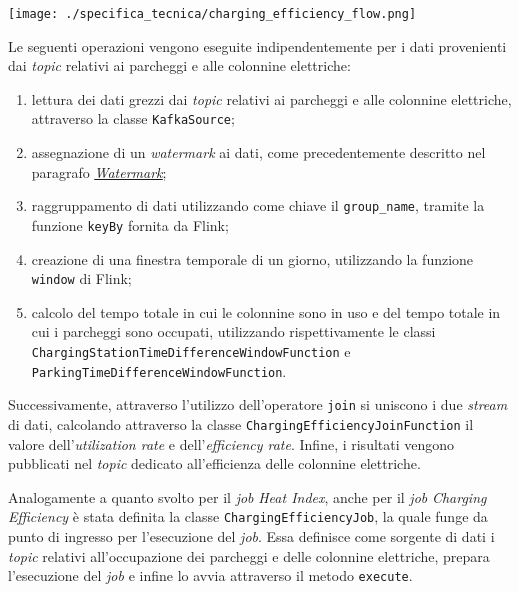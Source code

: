 \begin{center}
	\texttt{[image: ./specifica\_tecnica/charging\_efficiency\_flow.png]}
\end{center}
Le seguenti operazioni vengono eseguite indipendentemente per i dati provenienti dai \textit{topic} relativi ai parcheggi e alle colonnine elettriche:
\begin{enumerate}
	\item lettura dei dati grezzi dai \textit{topic} relativi ai parcheggi e alle colonnine elettriche, attraverso la classe \texttt{KafkaSource};
	\item assegnazione di un \textit{watermark} ai dati, come precedentemente descritto nel paragrafo \hyperref[watermark]{\underline{\textit{Watermark}}};
	\item raggruppamento di dati utilizzando come chiave il \texttt{group\_name}, tramite la funzione \texttt{keyBy} fornita da Flink;
	\item creazione di una finestra temporale di un giorno, utilizzando la funzione \texttt{window} di Flink;
	\item calcolo del tempo totale in cui le colonnine sono in uso e del tempo totale in cui i parcheggi sono occupati, utilizzando rispettivamente le classi
	      \\\texttt{ChargingStationTimeDifferenceWindowFunction} e \texttt{ParkingTimeDifferenceWindowFunction}.
\end{enumerate}
Successivamente, attraverso l'utilizzo dell'operatore \texttt{join} si uniscono i due \textit{stream} di dati, calcolando
attraverso la classe \texttt{ChargingEfficiencyJoinFunction} il valore dell'\textit{utilization rate} e dell'\textit{efficiency rate}.
Infine, i risultati vengono pubblicati nel \textit{topic} dedicato all'efficienza delle colonnine elettriche.

Analogamente a quanto svolto per il \textit{job} \textit{Heat Index}, anche per il \textit{job} \textit{Charging Efficiency} è stata definita la
classe \texttt{ChargingEfficiencyJob}, la quale funge da punto di ingresso per l'esecuzione del \textit{job}. Essa definisce come sorgente di dati
i \textit{topic} relativi all'occupazione dei parcheggi e delle colonnine elettriche, prepara l'esecuzione del \textit{job} e infine lo avvia
attraverso il metodo \texttt{execute}.\\

